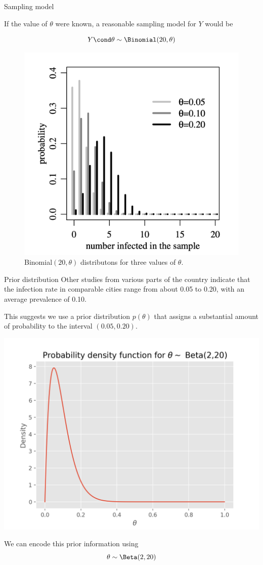 \documentclass[10pt]{beamer}
\begin{document}
\begin{frame}{Sampling model}

If the value of $\theta$ were known,  a reasonable sampling model for $Y$ would be

\[  Y \cond \theta \sim \Binomial(20, \theta)\]




\begin{figure}
\includegraphics[width=.45\textwidth]{images/binomial_pmf_hoff_example_prob_of_rare_event}
\caption{Binomial$(20,\theta)$ distributons for three values of $\theta$.}
\end{figure}



\end{frame}

\begin{frame}{Prior distribution}
Other studies from various parts of the country indicate that the infection rate in comparable cities range from about 0.05 to 0.20, with an average prevalence of 0.10.

\pause 

This suggests we use a prior distribution $p(\theta)$ that assigns a substantial amount of probability to the interval $(0.05, 0.20)$.
\pause 

\begin{center}
\includegraphics[width=.45\textwidth]{images/beta_pdf}
\end{center}

We can encode this prior information using
\[  \theta \sim \Beta(2,20) \] 


\end{frame}
\end{document}
